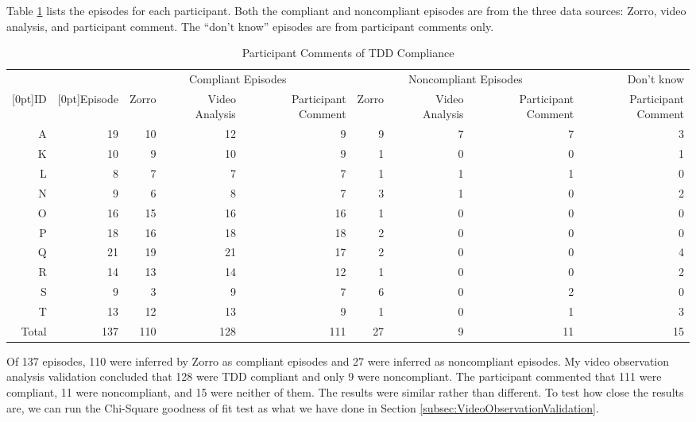 Table \ref{tab:ComplianceParticipantValidation} lists the episodes for 
each participant. Both the compliant and noncompliant episodes are
from the three data sources: Zorro, video analysis, and participant 
comment. The ``don't know'' episodes are from participant comments
only.
\begin{table}
  \centering
\begin{tabular}{|r|r|rrr|rrr|r|} \hline
  &  &  \multicolumn{3}{c|}{Compliant Episodes} 
     &  \multicolumn{3}{c|}{Noncompliant Episodes} & Don't know\\\cline{3-9}
  \raisebox{1.5ex}[0pt]{ID} & \raisebox{1.5ex}[0pt]{Episode} & 
   Zorro & Video Analysis  & Participant Comment &  Zorro & Video Analysis  & Participant Comment & Participant Comment\\ \hline
   A & 19 & 10 & 12 &  9 & 9 & 7 & 7 & 3 \\ \hline
   K & 10 & 9  & 10 &  9 & 1 & 0 & 0 & 1 \\ \hline
   L & 8  &  7 & 7  &  7 & 1 & 1 & 1 & 0 \\ \hline
   N & 9  &  6 & 8  &  7 & 3 & 1 & 0 & 2 \\ \hline
   O & 16 & 15 & 16 & 16 & 1 & 0 & 0 & 0 \\ \hline
   P & 18 & 16 & 18 & 18 & 2 & 0 & 0 & 0 \\ \hline
   Q & 21 & 19 & 21 & 17 & 2 & 0 & 0 & 4 \\ \hline
   R & 14 & 13 & 14 & 12 & 1 & 0 & 0 & 2 \\ \hline
   S & 9  &  3 &  9 &  7 & 6 & 0 & 2 & 0 \\ \hline
   T & 13 & 12 & 13 &  9 & 1 & 0 & 1 & 3 \\ \hline
   Total  & 137 & 110 &  128 &  111 &  27 & 9 & 11 & 15 \\ \hline
\end{tabular}  
  \caption{Participant Comments of TDD Compliance}
  \label{tab:ComplianceParticipantValidation} 
\end{table}
Of 137 episodes, 110 were inferred by Zorro as compliant episodes and 
27 were inferred as noncompliant episodes. My video observation
analysis validation concluded that 128 were TDD compliant and only
9 were noncompliant. The participant commented that 111 were 
compliant, 11 were noncompliant, and 15 were neither of them. 
The results were similar rather than different. To test how
close the results are, we can run the Chi-Square goodness of fit
test as what we have done in Section \ref{subsec:VideoObservationValidation}.

